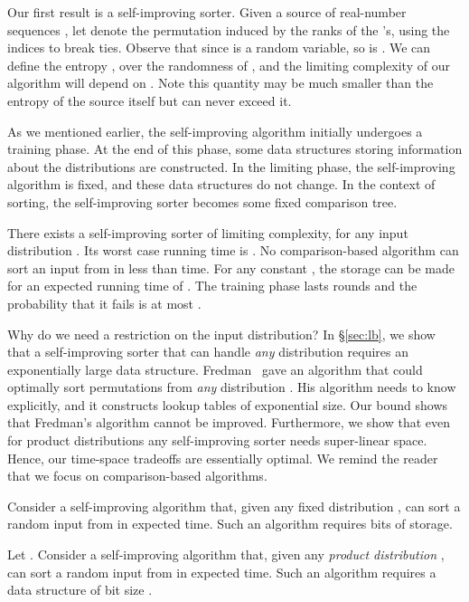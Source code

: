 \documentclass{siamltex}
\begin{document}
Our first result is a self-improving sorter.
Given a source  of real-number sequences 
,
let  denote the permutation induced by the ranks of the 's,
using the indices  to break ties. Observe that since 
is a random variable, so is .
We can define the entropy , over
the randomness of , and
the limiting complexity of our algorithm will depend on
. Note this quantity may be much smaller
than the entropy of the source itself but can never exceed it.

As we mentioned earlier, the self-improving algorithm
initially undergoes a training phase. At the end of this
phase, some data structures storing information about
the distributions are constructed. In the limiting phase,
the self-improving algorithm is fixed, and
these data structures do not change. In the context of sorting,
the self-improving sorter becomes some fixed comparison tree.
\medskip
\begin{theorem}\label{thm:sort-with-preprocessing}
There exists a self-improving sorter of 
 limiting complexity,
for any input distribution .
Its worst case running time is .
No comparison-based algorithm can sort an input from
 in less than  time.
For any constant ,
the storage can be made  for 
an expected running time of .
The training phase lasts  rounds and the probability
that it fails is at most .
\end{theorem}
\medskip

Why do we need a restriction on the input distribution?
In \S\ref{sec:lb}, we show that a self-improving sorter 
that can handle \emph{any} distribution requires an exponentially
large data structure. 
Fredman~\cite{Fredman76}
gave an algorithm that could optimally sort permutations from \emph{any} 
distribution . His algorithm needs to know  
explicitly, and it constructs lookup tables of exponential size. 
Our bound shows that Fredman's algorithm cannot 
be improved.
Furthermore, we show that even for product distributions any
self-improving sorter needs super-linear space. Hence, our time-space
tradeoffs are essentially optimal. We remind the reader that we
focus on comparison-based algorithms.
\medskip
\begin{theorem} \label{thm:sort-lb} 
Consider a self-improving algorithm that, given any 
fixed distribution , can sort a random input from  in
expected  time.
Such an algorithm requires  bits of storage.

Let .
Consider a self-improving algorithm that,
given any \emph{product distribution} ,
can sort a random input from  in expected  time.
Such an algorithm requires a data structure 
of bit size .
\end{theorem}
\medskip
\end{document}
